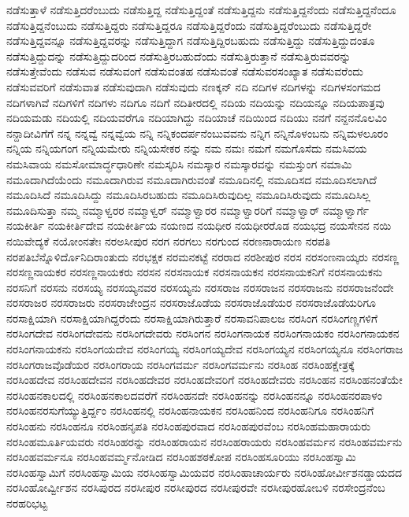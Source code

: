 {ನಡೆಸುತ್ತಾಳೆ
ನಡೆಸುತ್ತಿದರೆಂಬುದು
ನಡೆಸುತ್ತಿದ್ದ
ನಡೆಸುತ್ತಿದ್ದಂತೆ
ನಡೆಸುತ್ತಿದ್ದನು
ನಡೆಸುತ್ತಿದ್ದನೆಂದು
ನಡೆಸುತ್ತಿದ್ದನೆಂದೂ
ನಡೆಸುತ್ತಿದ್ದನೆಂಬುದು
ನಡೆಸುತ್ತಿದ್ದರು
ನಡೆಸುತ್ತಿದ್ದರೂ
ನಡೆಸುತ್ತಿದ್ದರೆಂದು
ನಡೆಸುತ್ತಿದ್ದರೆಂಬುದು
ನಡೆಸುತ್ತಿದ್ದರೇ
ನಡೆಸುತ್ತಿದ್ದವನ್ನೂ
ನಡೆಸುತ್ತಿದ್ದವರನ್ನು
ನಡೆಸುತ್ತಿದ್ದಾಗ
ನಡೆಸುತ್ತಿದ್ದಿರಬಹುದು
ನಡೆಸುತ್ತಿದ್ದು
ನಡೆಸುತ್ತಿದ್ದುದಂತೂ
ನಡೆಸುತ್ತಿದ್ದುದನ್ನು
ನಡೆಸುತ್ತಿದ್ದುದರಿಂದ
ನಡೆಸುತ್ತಿರಬಹುದೆಂದು
ನಡೆಸುತ್ತಿರುತ್ತಾನೆ
ನಡೆಸುತ್ತಿರುವವರನ್ನು
ನಡೆಸುತ್ತೇವೆಂದು
ನಡೆಸುವ
ನಡೆಸುವಂಗೆ
ನಡೆಸುವಂತಹ
ನಡೆಸುವಂತೆ
ನಡೆಸುವರಸಂಖ್ಯಾತ
ನಡೆಸುವರೆಂದು
ನಡೆಸುವವರಿಗೆ
ನಡೆಸುವಾತ
ನಡೆಸುವುದಾಗಿ
ನಡೆಸುವುದು
ನಣಕ್ಕನ್
ನದಿ
ನದಿಗಳ
ನದಿಗಳನ್ನು
ನದಿಗಳಸಂಗಮದ
ನದಿಗಳಾಗಿವೆ
ನದಿಗಳಿಗೆ
ನದಿಗಳು
ನದಿಗೂ
ನದಿಗೆ
ನದಿತೀರದಲ್ಲಿ
ನದಿಯ
ನದಿಯನ್ನು
ನದಿಯನ್ನೂ
ನದಿಯಪಾತ್ರವು
ನದಿಯಮಡು
ನದಿಯಲ್ಲಿ
ನದಿಯವರೆಗೂ
ನದಿಯಾಗಿದ್ದು
ನದಿಯಾಚೆ
ನದಿಯಿಂದ
ನದಿಯು
ನನಗೆ
ನನ್ದನನೊಲವಿಂ
ನನ್ದಾದೀವಿಗೆಗೆ
ನನ್ನ
ನನ್ನವ್ವೆ
ನನ್ನವ್ವೆಯ
ನನ್ನಿ
ನನ್ನಿಕಂದರ್ಪನೆಂಬುವವನು
ನನ್ನಿಗ
ನನ್ನಿನೊಳಂಬನು
ನನ್ನಿಮಳಲೂರಂ
ನನ್ನಿಯ
ನನ್ನಿಯಗಂಗ
ನನ್ನಿಯಮೇರು
ನನ್ನಿಯಸೇಕರ
ನನ್ನು
ನಮ
ನಮಃ
ನಮಗೆ
ನಮಗೊಸೆದು
ನಮಸಿವಯ
ನಮಸಿವಾಯ
ನಮಸೋಮಾರ್ದ್ಧಧಾರಿಣೇ
ನಮಸ್ಕರಿಸಿ
ನಮಸ್ಕಾರ
ನಮಸ್ಕಾರವನ್ನು
ನಮಸ್ತುಂಗ
ನಮಾಮಿ
ನಮೂದಾಗಿದೆಯೆಂದು
ನಮೂದಾಗಿರುವ
ನಮೂದಾಗಿರುವಂತೆ
ನಮೂದಿನಲ್ಲಿ
ನಮೂದಿಸದ
ನಮೂದಿಸಲಾಗಿದೆ
ನಮೂದಿಸಿದೆ
ನಮೂದಿಸಿದ್ದು
ನಮೂದಿಸಿರಬಹುದು
ನಮೂದಿಸಿರುವುದಿಲ್ಲ
ನಮೂದಿಸಿರುವುದು
ನಮೂದಿಸಿಲ್ಲ
ನಮೂದಿಸುತ್ತಾ
ನಮ್ಮ
ನಮ್ಮಾಳ್ವರರ
ನಮ್ಮಾಳ್ವರ್
ನಮ್ಮಾಳ್ವಾರರ
ನಮ್ಮಾಳ್ವಾರರಿಗೆ
ನಮ್ಮಾಳ್ವಾರ್
ನಮ್ಮಾಳ್ವಾರ್ಗೆ
ನಯಕೀರ್ತಿ
ನಯಕೀರ್ತಿದೇವ
ನಯಕೀರ್ತಿಯ
ನಯಣದ
ನಯಧೀರ
ನಯಧೀರರೊಡ
ನಯಭದ್ರ
ನಯಸೇನನ
ನಯಿ
ನಯಿವೇದ್ಯಕೆ
ನಯೋಂನತೇಃ
ನರಅಸೀಪುರ
ನರಗ
ನರಗಲು
ನರಗುಂದ
ನರಣನಾರಾಯಣ
ನರಪತಿ
ನರಪತಿಬೆನ್ನೊಳಿರ್ದೊನಿದಿರಾಂತುದು
ನರಭಕ್ಷಕ
ನರಮನಕಟ್ಟೆ
ನರರಾದ
ನರಶೀಪುರ
ನರಸ
ನರಸಂಣನಾಯ್ಕರು
ನರಸಣ್ಣ
ನರಸಣ್ಣನಾಯಕರ
ನರಸಣ್ಣನಾಯಕರು
ನರಸನ
ನರಸನಾಯಕ
ನರಸನಾಯಕನ
ನರಸನಾಯಕನಿಗೆ
ನರಸನಾಯಕನು
ನರಸನಿಗೆ
ನರಸನು
ನರಸಯ್ಯ
ನರಸಯ್ಯನವರ
ನರಸಯ್ಯನು
ನರಸರಾಜ
ನರಸರಾಜನ
ನರಸರಾಜನು
ನರಸರಾಜನೆಂದೇ
ನರಸರಾಜರ
ನರಸರಾಜರು
ನರಸರಾಜೇಂದ್ರನ
ನರಸರಾಜೊಡೆಯ
ನರಸರಾಜೊಡೆಯರ
ನರಸರಾಜೊಡೆಯರಿಗೂ
ನರಸಾಕ್ಷಿಯಾಗಿ
ನರಸಾಕ್ಷಿಯಾಗಿದ್ದರೆಂದು
ನರಸಾಕ್ಷಿಯಾಗಿರುತ್ತಾರೆ
ನರಸಾವನಿಪಾಲಜ
ನರಸಿಂಗ
ನರಸಿಂಗಣ್ಣಗಳಿಗೆ
ನರಸಿಂಗದೇವ
ನರಸಿಂಗದೇವನು
ನರಸಿಂಗದೇವರು
ನರಸಿಂಗನ
ನರಸಿಂಗನಾಯಕ
ನರಸಿಂಗನಾಯಕಂ
ನರಸಿಂಗನಾಯಕನ
ನರಸಿಂಗನಾಯಕನು
ನರಸಿಂಗಯದೇವ
ನರಸಿಂಗಯ್ಯ
ನರಸಿಂಗಯ್ಯದೇವ
ನರಸಿಂಗಯ್ಯನ
ನರಸಿಂಗಯ್ಯನೂ
ನರಸಿಂಗರಾಜ
ನರಸಿಂಗರಾಜವೊಡೆಯರ
ನರಸಿಂಗರಾಯ
ನರಸಿಂಗವರ್ಮ
ನರಸಿಂಗವರ್ಮನು
ನರಸಿಂಹ
ನರಸಿಂಹಕ್ಷೇತ್ರಕ್ಕೆ
ನರಸಿಂಹದೇವ
ನರಸಿಂಹದೇವನ
ನರಸಿಂಹದೇವರ
ನರಸಿಂಹದೇವರಿಗೆ
ನರಸಿಂಹದೇವರು
ನರಸಿಂಹನ
ನರಸಿಂಹನಂತೆಯೇ
ನರಸಿಂಹನಕಾಲದಲ್ಲಿ
ನರಸಿಂಹನಕಾಲದವರೆಗೆ
ನರಸಿಂಹನದೇ
ನರಸಿಂಹನನ್ನು
ನರಸಿಂಹನನ್ನೂ
ನರಸಿಂಹನರಪಾಳಂ
ನರಸಿಂಹನರಸುಗೆಯ್ಯುತ್ತಿರ್ದ್ದಂ
ನರಸಿಂಹನಲ್ಲಿ
ನರಸಿಂಹನಾಯಕನ
ನರಸಿಂಹನಿಂದ
ನರಸಿಂಹನಿಗೂ
ನರಸಿಂಹನಿಗೆ
ನರಸಿಂಹನು
ನರಸಿಂಹನೂ
ನರಸಿಂಹನೃಪತಿ
ನರಸಿಂಹಪುರವಾದ
ನರಸಿಂಹಪುರವೆಂಬ
ನರಸಿಂಹಮಹಾರಾಯರು
ನರಸಿಂಹಮೂರ್ತಿಯವರು
ನರಸಿಂಹರನ್ನು
ನರಸಿಂಹರಾಯನ
ನರಸಿಂಹರಾಯರು
ನರಸಿಂಹವರ್ಮನ
ನರಸಿಂಹವರ್ಮನು
ನರಸಿಂಹವರ್ಮನೂ
ನರಸಿಂಹವರ್ಮ್ಮನೋಡಿದ
ನರಸಿಂಹಶಠಕೋಪ
ನರಸಿಂಹಸೂರಿಯು
ನರಸಿಂಹಸ್ವಾಮಿ
ನರಸಿಂಹಸ್ವಾಮಿಗೆ
ನರಸಿಂಹಸ್ವಾಮಿಯ
ನರಸಿಂಹಸ್ವಾಮಿಯವರ
ನರಸಿಂಹಾಚಾರ್ಯರು
ನರಸಿಂಹೋರ್ವೀಶನಡ್ಡಾಯದದ
ನರಸಿಂಹೋರ್ವ್ವೀಶನ
ನರಸಿಪುರದ
ನರಸೀಪುರ
ನರಸೀಪುರದ
ನರಸೀಪುರವೇ
ನರಸೀಪುರಹೋಬಳಿ
ನರಸೇಂದ್ರನೆಂಬ
ನರಹರಿಭಟ್ಟ
}
